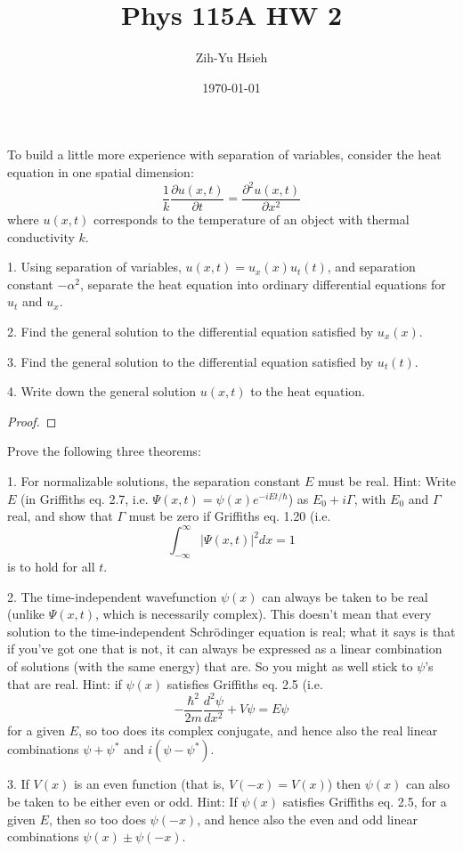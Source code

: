 \documentclass{article}
\title{Phys 115A HW 2}
\author{Zih-Yu Hsieh}
\date{\today}
\begin{document}
\maketitle

\begin{ques}\label{q1}
To build a little more experience with separation of variables, consider the heat equation
in one spatial dimension:
\[
\frac{1}{k}\frac{\partial u(x, t)}{\partial t} = \frac{\partial^2 u(x, t)}{\partial x^2}
\]
where $u(x, t)$ corresponds to the temperature of an object with thermal conductivity $k$.

1. Using separation of variables, $u(x, t) = u_x(x)u_t(t)$, and separation constant $-\alpha^2$, separate the heat equation into ordinary differential equations for $u_t$ and $u_x$.

2. Find the general solution to the differential equation satisfied by $u_x(x)$.

3. Find the general solution to the differential equation satisfied by $u_t(t)$.

4. Write down the general solution $u(x, t)$ to the heat equation.
\end{ques}

\begin{proof}
\end{proof}

\newpage

\begin{ques}\label{q2}
Prove the following three theorems:

1. For normalizable solutions, the separation constant $E$ must be real. Hint: Write $E$
(in Griffiths eq. 2.7, i.e. $\Psi(x, t) = \psi(x)e^{-iEt/\hbar}$) as $E_0 + i\Gamma$, with $E_0$ and $\Gamma$ real, and
show that $\Gamma$ must be zero if Griffiths eq. 1.20 (i.e.
\[
\int_{-\infty}^{\infty} |\Psi(x, t)|^2 dx = 1
\]
is to hold for all $t$.

2. The time-independent wavefunction $\psi(x)$ can always be taken to be real (unlike
$\Psi(x, t)$, which is necessarily complex). This doesn’t mean that every solution to the
time-independent Schrödinger equation is real; what it says is that if you’ve got one
that is not, it can always be expressed as a linear combination of solutions (with the
same energy) that are. So you might as well stick to $\psi$’s that are real. Hint: if $\psi(x)$
satisfies Griffiths eq. 2.5 (i.e.
\[
-\frac{\hbar^2}{2m}\frac{d^2\psi}{dx^2} + V\psi = E\psi
\]
for a given $E$, so too does its complex conjugate, and hence also the real linear combinations
$\psi+\psi^*$ and $i(\psi-\psi^*)$.

3. If $V(x)$ is an even function (that is, $V(-x) = V(x)$) then $\psi(x)$ can also be taken to
be either even or odd. Hint: If $\psi(x)$ satisfies Griffiths eq. 2.5, for a given $E$, then so
too does $\psi(-x)$, and hence also the even and odd linear combinations $\psi(x)\pm\psi(-x)$.
\end{ques}
\end{document}
